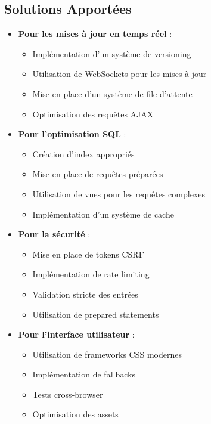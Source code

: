 \documentclass[12pt,a4paper]{article}
\begin{document}
\subsection{Solutions Apportées}
\begin{itemize}
    \item \textbf{Pour les mises à jour en temps réel} :
    \begin{itemize}
        \item Implémentation d'un système de versioning
        \item Utilisation de WebSockets pour les mises à jour
        \item Mise en place d'un système de file d'attente
        \item Optimisation des requêtes AJAX
    \end{itemize}

    \item \textbf{Pour l'optimisation SQL} :
    \begin{itemize}
        \item Création d'index appropriés
        \item Mise en place de requêtes préparées
        \item Utilisation de vues pour les requêtes complexes
        \item Implémentation d'un système de cache
    \end{itemize}

    \item \textbf{Pour la sécurité} :
    \begin{itemize}
        \item Mise en place de tokens CSRF
        \item Implémentation de rate limiting
        \item Validation stricte des entrées
        \item Utilisation de prepared statements
    \end{itemize}

    \item \textbf{Pour l'interface utilisateur} :
    \begin{itemize}
        \item Utilisation de frameworks CSS modernes
        \item Implémentation de fallbacks
        \item Tests cross-browser
        \item Optimisation des assets
    \end{itemize}
\end{itemize}
\end{document}
